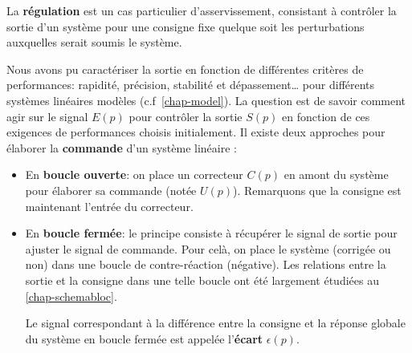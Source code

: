 La \textbf{régulation} est un cas particulier d'asservissement, consistant
à contrôler la sortie d'un système pour une consigne fixe quelque soit 
les perturbations auxquelles serait soumis le système.
\begin{center}
    
\end{center}
Nous avons pu caractériser la sortie en fonction de différentes 
critères de performances: rapidité, précision, stabilité et dépassement\ldots
pour différents systèmes linéaires modèles (c.f~\cref{chap-model}). 
La question est de savoir comment agir sur le 
signal $E(p)$ pour contrôler la sortie $S(p)$ en fonction de 
ces exigences de performances choisis initialement.
\newpage
\restoregeometry
\captionsetup{width=0.9\linewidth}
Il existe deux approches pour élaborer la \textbf{commande} 
d'un système linéaire :%
\begin{itemize}
    \item En \textbf{boucle ouverte}: on place un correcteur $C(p)$
          en amont du système pour élaborer 
          sa commande (notée $U(p)$).
          Remarquons que la consigne est maintenant
          l'entrée du correcteur.
    \begin{center}
        
    \end{center}
    \item En \textbf{boucle fermée}: le principe consiste à récupérer 
          le signal de sortie pour ajuster le signal de commande. 
          Pour celà, on place le système (corrigée ou non) dans une 
          boucle de contre-réaction (négative). 
          Les relations entre la sortie et la consigne dans une telle 
          boucle ont été largement étudiées au \cref{chap-schemabloc}.
    \begin{center}
        
    \end{center}
          Le signal correspondant à la différence entre la consigne
          et la réponse globale du système en boucle fermée est
          appelée l'\textbf{écart} $\epsilon(p)$.
\end{itemize}
